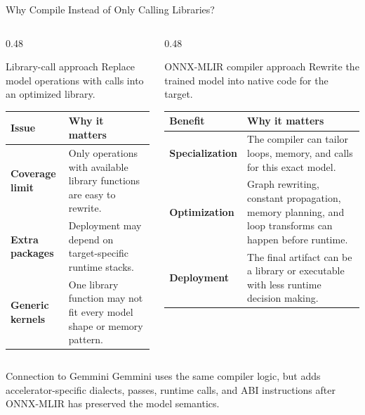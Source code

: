 \documentclass[aspectratio=169,10pt]{beamer}
\newcommand{\edgeword}[1]{\textcolor{red!75!black}{\textbf{#1}}}
\begin{document}
\begin{frame}{Why Compile Instead of Only Calling Libraries?}
  \scriptsize
  \begin{columns}[T,onlytextwidth]
    \begin{column}{0.48\textwidth}
      \begin{block}{Library-call approach}
        Replace model operations with calls into an optimized library.
      \end{block}
      \begin{tabularx}{\textwidth}{@{}lX@{}}
        \toprule
        Issue & Why it matters \\
        \midrule
        \edgeword{Coverage limit} & Only operations with available library functions are easy to rewrite. \\
        \edgeword{Extra packages} & Deployment may depend on target-specific runtime stacks. \\
        \edgeword{Generic kernels} & One library function may not fit every model shape or memory pattern. \\
        \bottomrule
      \end{tabularx}
    \end{column}
    \begin{column}{0.48\textwidth}
      \begin{block}{ONNX-MLIR compiler approach}
        Rewrite the trained model into native code for the target.
      \end{block}
      \begin{tabularx}{\textwidth}{@{}lX@{}}
        \toprule
        Benefit & Why it matters \\
        \midrule
        \edgeword{Specialization} & The compiler can tailor loops, memory, and calls for this exact model. \\
        \edgeword{Optimization} & Graph rewriting, constant propagation, memory planning, and loop transforms can happen before runtime. \\
        \edgeword{Deployment} & The final artifact can be a library or executable with less runtime decision making. \\
        \bottomrule
      \end{tabularx}
    \end{column}
  \end{columns}

  \vspace{0.45em}
  \begin{block}{Connection to Gemmini}
    Gemmini uses the same compiler logic, but adds accelerator-specific dialects, passes, runtime calls, and ABI instructions after ONNX-MLIR has preserved the model semantics.
  \end{block}
\end{frame}
\end{document}
